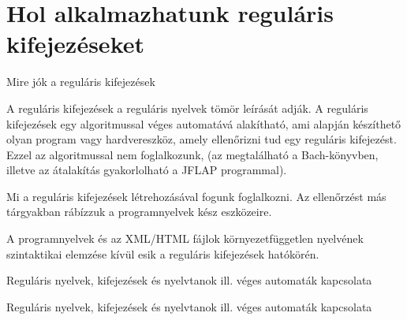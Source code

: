 \documentclass[
    ignorenonframetext
    ]{beamer}
\begin{document}
\frame{\tableofcontents}

\section{Hol alkalmazhatunk reguláris kifejezéseket}

\begin{frame}
    {Mire jók a reguláris kifejezések}

    A reguláris kifejezések a reguláris nyelvek tömör leírását adják. A
    reguláris kifejezések egy algoritmussal véges automatává alakítható,
    ami alapján készíthető olyan program vagy hardvereszköz, amely
    ellenőrizni tud egy reguláris kifejezést. Ezzel az algoritmussal nem
    foglalkozunk, (az megtalálható a Bach-könyvben, illetve az átalakítás
    gyakorlolható a JFLAP programmal).

    \vfill
    Mi a reguláris kifejezések létrehozásával fogunk foglalkozni. Az
    ellenőrzést más tárgyakban rábízzuk a programnyelvek kész eszközeire.

    \vfill
    A programnyelvek és az XML/HTML fájlok környezetfüggetlen nyelvének
    szintaktikai elemzése kívül esik a reguláris kifejezések hatókörén.
\end{frame}

\begin{frame}
    {Reguláris nyelvek, kifejezések és nyelvtanok ill. véges automaták
    kapcsolata}

\end{frame}

\begin{frame}
    {Reguláris nyelvek, kifejezések és nyelvtanok ill. véges automaták
    kapcsolata}

\end{frame}
\end{document}
